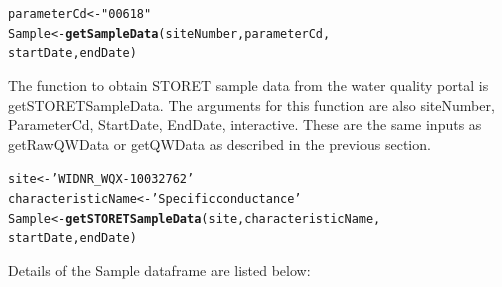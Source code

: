 \documentclass[a4paper,11pt]{article}\usepackage[]{graphicx}\usepackage[]{color}
\makeatletter
\newcommand{\hlstr}[1]{\textcolor[rgb]{0.192,0.494,0.8}{#1}}%
\newcommand{\hlstd}[1]{\textcolor[rgb]{0.345,0.345,0.345}{#1}}%
\newcommand{\hlkwb}[1]{\textcolor[rgb]{0.69,0.353,0.396}{#1}}%
\newcommand{\hlkwd}[1]{\textcolor[rgb]{0.737,0.353,0.396}{\textbf{#1}}}%
\newenvironment{kframe}{%
 \def\at@end@of@kframe{}%
 \ifinner\ifhmode%
  \def\at@end@of@kframe{\end{minipage}}%
  \begin{minipage}{\columnwidth}%
 \fi\fi%
 \def\FrameCommand##1{\hskip\@totalleftmargin \hskip-\fboxsep
 \colorbox{shadecolor}{##1}\hskip-\fboxsep
     \hskip-\linewidth \hskip-\@totalleftmargin \hskip\columnwidth}%
 \MakeFramed {\advance\hsize-\width
   \@totalleftmargin\z@ \linewidth\hsize
   \@setminipage}}%
 {\par\unskip\endMakeFramed%
 \at@end@of@kframe}
\newenvironment{knitrout}{}{} %
\makeatother
\begin{document}
\begin{knitrout}
\color{fgcolor}\begin{kframe}
\begin{alltt}
\hlstd{parameterCd} \hlkwb{<-} \hlstr{"00618"}
\hlstd{Sample} \hlkwb{<-}\hlkwd{getSampleData}\hlstd{(siteNumber,parameterCd,}
      \hlstd{startDate, endDate)}
\end{alltt}
\end{kframe}
\end{knitrout}


The function to obtain STORET sample data from the water quality portal is getSTORETSampleData. The arguments for this function are also siteNumber, ParameterCd, StartDate, EndDate, interactive. These are the same inputs as getRawQWData or getQWData as described in the previous section.

\begin{knitrout}
\color{fgcolor}\begin{kframe}
\begin{alltt}
\hlstd{site} \hlkwb{<-} \hlstr{'WIDNR_WQX-10032762'}
\hlstd{characteristicName} \hlkwb{<-} \hlstr{'Specific conductance'}
\hlstd{Sample} \hlkwb{<-}\hlkwd{getSTORETSampleData}\hlstd{(site,characteristicName,}
      \hlstd{startDate, endDate)}
\end{alltt}
\end{kframe}
\end{knitrout}



\pagebreak

Details of the Sample dataframe are listed below:
\end{document}
